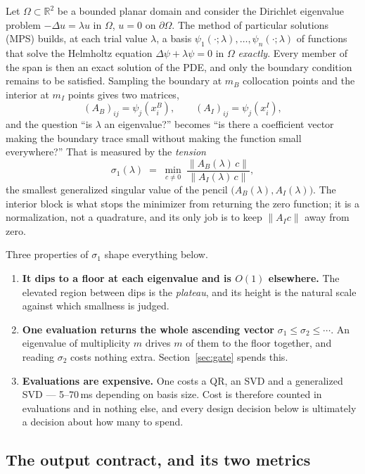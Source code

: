 \documentclass[11pt]{article}
\theoremstyle{definition}
\theoremstyle{remark}
\newcommand{\R}{\mathbb{R}}
\newcommand{\Om}{\Omega}
\newcommand{\lam}{\lambda}
\newcommand{\sig}{\sigma}
\newcommand{\norm}[1]{\left\lVert #1 \right\rVert}
\begin{document}
Let $\Om\subset\R^2$ be a bounded planar domain and consider the Dirichlet eigenvalue problem
$-\Delta u = \lam u$ in $\Om$, $u=0$ on $\partial\Om$. The method of particular solutions
(MPS) builds, at each trial value $\lam$, a basis $\psi_1(\cdot;\lam),\dots,\psi_n(\cdot;\lam)$
of functions that solve the Helmholtz equation $\Delta\psi + \lam\psi = 0$ in $\Om$
\emph{exactly}. Every member of the span is then an exact solution of the PDE, and only the
boundary condition remains to be satisfied. Sampling the boundary at $m_B$ collocation points
and the interior at $m_I$ points gives two matrices,
\[
  (A_B)_{ij} = \psi_j(x^B_i), \qquad (A_I)_{ij} = \psi_j(x^I_i),
\]
and the question ``is $\lam$ an eigenvalue?'' becomes ``is there a coefficient vector making
the boundary trace small without making the function small everywhere?'' That is measured by
the \emph{tension}
\begin{equation}\label{eq:tension}
  \sig_1(\lam) \;=\; \min_{c\neq0}\ \frac{\norm{A_B(\lam)\,c}}{\norm{A_I(\lam)\,c}},
\end{equation}
the smallest generalized singular value of the pencil $\bigl(A_B(\lam),A_I(\lam)\bigr)$. The
interior block is what stops the minimizer from returning the zero function; it is a
normalization, not a quadrature, and its only job is to keep $\norm{A_I c}$ away from zero.

Three properties of $\sig_1$ shape everything below.

\begin{enumerate}
\item \textbf{It dips to a floor at each eigenvalue and is $O(1)$ elsewhere.} The elevated
region between dips is the \emph{plateau}, and its height is the natural scale against which
smallness is judged.
\item \textbf{One evaluation returns the whole ascending vector}
$\sig_1\le\sig_2\le\cdots$. An eigenvalue of multiplicity $m$ drives $m$ of them to the floor
together, and reading $\sig_2$ costs nothing extra. Section~\ref{sec:gate} spends this.
\item \textbf{Evaluations are expensive.} One costs a QR, an SVD and a generalized SVD ---
5--70\,ms depending on basis size. Cost is therefore counted in evaluations and in nothing
else, and every design decision below is ultimately a decision about how many to spend.
\end{enumerate}

\subsection{The output contract, and its two metrics}
\end{document}
